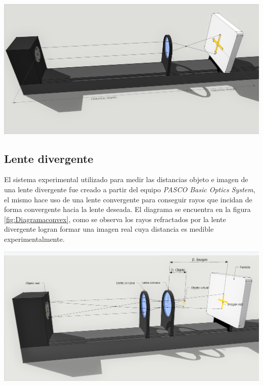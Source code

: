\documentclass[a4paper,12pt]{article}
\newenvironment{Figure}
  {\par\medskip\noindent\minipage{\linewidth}}
  {\endminipage\par\medskip}
\begin{document}
\begin{multicols*}{2}
        \begin{Figure}
            \centering
            \includegraphics[width=1\linewidth]{Lente convergente.jpg}
            \label{PASCOconv}
        \end{Figure}

    \subsection*{Lente divergente}

        El sistema experimental utilizado para medir las distancias objeto e imagen de una lente divergente fue creado a partir del equipo \emph{PASCO Basic Optics System}, el mismo hace uso de una lente convergente para conseguir rayos que incidan de forma convergente hacia la lente deseada. El diagrama se encuentra en la figura \ref{fig:Diagramaconvex}, como se observa los rayos refractados por la lente divergente logran formar una imagen real cuya distancia es medible experimentalmente.

        \begin{Figure}
            \centering
            \includegraphics[width=1\linewidth]{DLCX}
            \label{fig:Diagramaconvex}
        \end{Figure}


\end{multicols*}
\end{document}
